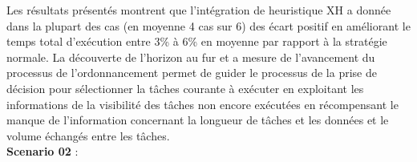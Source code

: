 %
Les résultats présentés montrent que l'intégration de heuristique XH a donnée dans la plupart des cas (en moyenne 4 cas sur 6) des écart positif en améliorant le temps total d’exécution entre 3\% à 6\% en moyenne par rapport à la stratégie normale. La découverte de l'horizon au fur et a mesure de l'avancement du processus de l'ordonnancement permet de guider le processus de la prise de décision pour sélectionner la tâches courante à exécuter en exploitant les informations de la visibilité des tâches non encore exécutées en récompensant le manque de l'information concernant la longueur de tâches et les données et le volume échangés entre les tâches.\\
%
\textbf{Scenario 02} :\\
